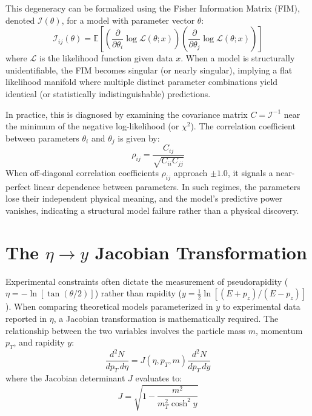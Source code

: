 This degeneracy can be formalized using the Fisher Information Matrix (FIM), denoted $\mathcal{I}(\theta)$, for a model with parameter vector $\theta$:
\begin{equation}
\mathcal{I}_{ij}(\theta) = \mathbb{E} \left[ \left(\frac{\partial}{\partial \theta_i} \log \mathcal{L}(\theta; x)\right) \left(\frac{\partial}{\partial \theta_j} \log \mathcal{L}(\theta; x)\right) \right]
\end{equation}
where $\mathcal{L}$ is the likelihood function given data $x$. When a model is structurally unidentifiable, the FIM becomes singular (or nearly singular), implying a flat likelihood manifold where multiple distinct parameter combinations yield identical (or statistically indistinguishable) predictions.

In practice, this is diagnosed by examining the covariance matrix $C = \mathcal{I}^{-1}$ near the minimum of the negative log-likelihood (or $\chi^2$). The correlation coefficient between parameters $\theta_i$ and $\theta_j$ is given by:
\begin{equation}
\rho_{ij} = \frac{C_{ij}}{\sqrt{C_{ii} C_{jj}}}
\end{equation}
When off-diagonal correlation coefficients $\rho_{ij}$ approach $\pm 1.0$, it signals a near-perfect linear dependence between parameters. In such regimes, the parameters lose their independent physical meaning, and the model's predictive power vanishes, indicating a structural model failure rather than a physical discovery.

\section{The $\eta \to y$ Jacobian Transformation}
Experimental constraints often dictate the measurement of pseudorapidity ($\eta = -\ln[\tan(\theta/2)]$) rather than rapidity ($y = \frac{1}{2}\ln[(E+p_z)/(E-p_z)]$). When comparing theoretical models parameterized in $y$ to experimental data reported in $\eta$, a Jacobian transformation is mathematically required. The relationship between the two variables involves the particle mass $m$, momentum $p_T$, and rapidity $y$:
\begin{equation}
\frac{d^2N}{dp_T \, d\eta} = J(\eta, p_T, m) \frac{d^2N}{dp_T \, dy}
\end{equation}
where the Jacobian determinant $J$ evaluates to:
\begin{equation}
J = \sqrt{1 - \frac{m^2}{m_T^2 \cosh^2 y}}
\end{equation}

